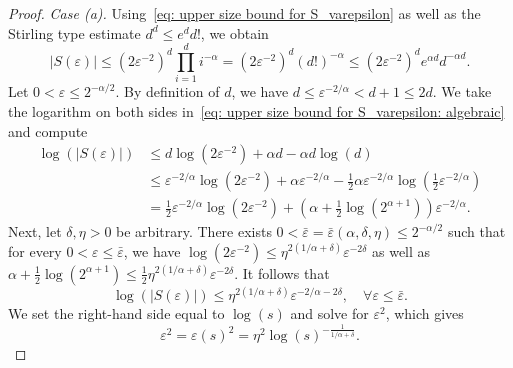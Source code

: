 \documentclass[10pt,a4paper]{amsart}
\newcommand{\abs}[1]{\left|#1\right|}
\begin{document}
\begin{proof}
    \emph{Case (a).}
    Using~\eqref{eq: upper size bound for S_varepsilon} as well as the Stirling type estimate \(d^d \leq e^d d!\), we obtain
    \begin{equation}
    \label{eq: upper size bound for S_varepsilon: algebraic}
        \abs{S(\varepsilon)} \leq (2\varepsilon^{-2})^d \prod_{i=1}^d i^{-\alpha}
        = (2\varepsilon^{-2})^d (d!)^{-\alpha}
        \leq (2\varepsilon^{-2})^d e^{\alpha d} d^{-\alpha d}.
    \end{equation}
    Let \(0 < \varepsilon \leq 2^{- \alpha / 2}\). By definition of \(d\), we have \(d \leq \varepsilon^{-2/\alpha} < d + 1 \leq 2d\). We take the logarithm on both sides in~\eqref{eq: upper size bound for S_varepsilon: algebraic} and compute
    \begin{align*}
        \log(\abs{S(\varepsilon)}) 
        &\leq d \log(2 \varepsilon^{-2}) + \alpha d - \alpha d \log(d) \\
        &\leq \varepsilon^{-2/\alpha} \log(2\varepsilon^{-2}) 
        + \alpha \varepsilon^{-2/\alpha} 
        - \frac{1}{2} \alpha \varepsilon^{-2/\alpha} \log\left( \frac{1}{2} \varepsilon^{-2/\alpha} \right) \\
        &= \frac{1}{2} \varepsilon^{-2/\alpha} \log(2 \varepsilon^{-2})
        + \left(\alpha + \frac{1}{2} \log(2^{\alpha + 1})\right) \varepsilon^{-2/\alpha}.
    \end{align*}
    Next, let \(\delta, \eta > 0\) be arbitrary. There exists \(0 < \bar{\varepsilon} = \bar{\varepsilon} (\alpha, \delta, \eta) \leq 2^{- \alpha / 2}\) such that for every \(0 < \varepsilon \leq \bar{\varepsilon}\), we have \(\log(2 \varepsilon^{-2}) \leq \eta^{2(1/\alpha + \delta)} \varepsilon^{-2\delta}\) as well as \(\alpha + \frac{1}{2} \log(2^{\alpha + 1}) \leq \frac{1}{2} \eta^{2(1/\alpha + \delta)} \varepsilon^{-2 \delta}\). It follows that
    \begin{equation}
    \label{eq: log-size bound for S_varepsilon: algebraic}
        \log(\abs{S(\varepsilon)}) 
        \leq \eta^{2(1/\alpha + \delta)} \varepsilon^{-2/\alpha - 2\delta},
        \quad \forall \varepsilon \leq \bar{\varepsilon}.
    \end{equation}
    We set the right-hand side equal to \(\log(s)\) and solve for \(\varepsilon^2\), which gives
    \begin{equation}
    \label{eq: s-term: equation for varepsilon and s: algebraic}
        \varepsilon^2 = \varepsilon(s)^2 = \eta^2 \log(s)^{-\frac{1}{1/\alpha + \delta}}.
    \end{equation}

\end{proof}
\end{document}
